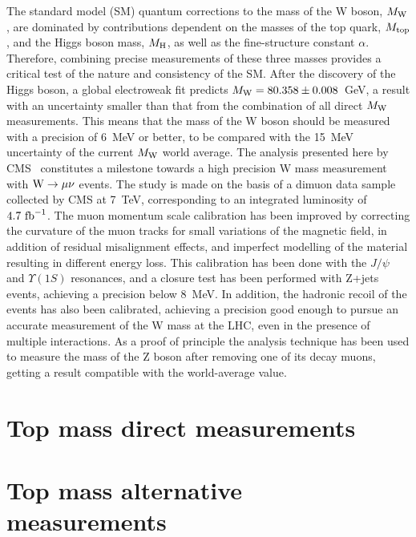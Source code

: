 \documentclass{blois}
\begin{document}
The standard model (SM) quantum corrections to the mass of the W boson, $M_{\rm W}$,
are dominated by contributions dependent on the masses of the top quark,
$M_{\rm top}$, and the Higgs boson mass, $M_{\rm H}$, as well as the fine-structure
constant $\alpha$. Therefore, combining precise measurements of these three masses
provides a critical test of the nature and consistency of the SM. After the discovery
of the Higgs boson, a global electroweak fit predicts $M_{\rm W} = 80.358 \pm 0.008$~GeV,
a result with an uncertainty smaller than that from the combination of all direct
$M_{\rm W}$ measurements. This means that the mass of the W boson should be
measured with a precision of 6~MeV or better, to be compared with the 15~MeV
uncertainty of the current $M_{\rm W}$ world average. The analysis presented
here by CMS~\cite{ref:CMS-WlikeZmass} constitutes a milestone towards a high
precision W mass measurement with
${\rm W\to\mu\nu}$ events. The study is made on the basis of a dimuon data sample
collected by CMS at 7~TeV, corresponding to an integrated luminosity of
$4.7~{\rm fb}^{-1}$. The muon momentum scale calibration has been improved by
correcting the curvature of the muon tracks for small variations of the magnetic
field, in addition of residual misalignment effects, and imperfect modelling of
the material resulting in different energy loss. This calibration has been done
with the $J/\psi$ and $\Upsilon(1S)$ resonances, and a closure test has been
performed with Z+jets events, achieving a precision below 8~MeV. In addition,
the hadronic recoil of the events has also been calibrated, achieving
a precision good enough to pursue an accurate measurement of the W mass
at the LHC, even in the presence of multiple interactions. As a proof of principle
the analysis technique has been used to measure the mass of the Z boson after
removing one of its decay muons, getting a result compatible with the
world-average value.


\section{Top mass direct measurements}


\section{Top mass alternative measurements}
\end{document}
